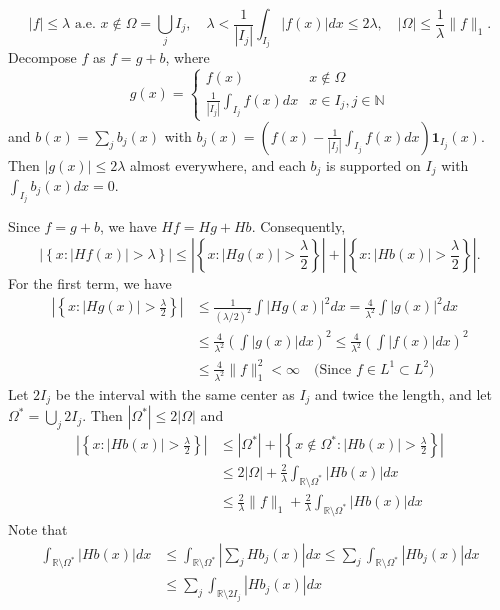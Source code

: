\documentclass[12pt,openany]{book}
\theoremstyle{definition}
\begin{document}
$$
|f| \leq \lambda \text{ a.e. } x \notin \Omega = \bigcup_j I_j, \quad \lambda < \frac{1}{\left|I_j\right|} \int_{I_j} |f(x)| dx \leq 2\lambda, \quad |\Omega| \leq \frac{1}{\lambda} \|f\|_1.
$$
Decompose $f$ as $f = g + b$, where
$$
g(x) = \begin{cases} 
f(x) & x \notin \Omega \\
\frac{1}{\left|I_j\right|} \int_{I_j} f(x) dx & x \in I_j, j \in \mathbb{N}
\end{cases}
$$
and $b(x) = \sum_j b_j(x)$ with $b_j(x) = \left(f(x) - \frac{1}{\left|I_j\right|} \int_{I_j} f(x) dx\right) \textbf{1}_{I_j}(x)$. Then $|g(x)| \leq 2\lambda$ almost everywhere, and each $b_j$ is supported on $I_j$ with $\int_{I_j} b_j (x) dx = 0$.

Since $f = g + b$, we have $H f = H g + H b$. Consequently,
$$
\left|\left\{x: |H f(x)| > \lambda\right\}\right| \leq \left|\left\{x: |H g(x)| > \frac{\lambda}{2}\right\}\right| + \left|\left\{x: |H b(x)| > \frac{\lambda}{2}\right\}\right|.
$$
For the first term, we have
$$
\begin{aligned}
\left|\left\{x: |Hg(x)| > \frac{\lambda}{2}\right\}\right| &\leqslant \frac{1}{(\lambda/2)^2} \int |Hg(x)|^2 dx = \frac{4}{\lambda^2} \int |g(x)|^2 dx \\
&\leqslant \frac{4}{\lambda^2} \left( \int |g(x)| dx \right)^2 \leqslant \frac{4}{\lambda^2} \left( \int |f(x)| dx \right)^2 \\
&\leqslant \frac{4}{\lambda^2} \|f\|_1^2 < \infty \quad \text{(Since } f \in L^1 \subset L^2\text{)}
\end{aligned}
$$
Let $2I_j$ be the interval with the same center as $I_j$ and twice the length, and let $\Omega^* = \bigcup_j 2I_j$. Then $|\Omega^*| \leq 2|\Omega|$ and
$$
\begin{aligned}
\left|\left\{x: |Hb(x)| > \frac{\lambda}{2}\right\}\right| &\leq |\Omega^*| + \left|\left\{x \notin \Omega^*: |Hb(x)| > \frac{\lambda}{2}\right\}\right| \\
&\leq 2|\Omega| + \frac{2}{\lambda} \int_{\mathbb{R} \setminus \Omega^*}|Hb(x)| dx \\
&\leq \frac{2}{\lambda}\|f\|_1 + \frac{2}{\lambda} \int_{\mathbb{R} \setminus \Omega^*}|Hb(x)| dx
\end{aligned}
$$
Note that
$$
\begin{aligned}
\int_{\mathbb{R} \setminus \Omega^*}|Hb(x)| dx &\leq \int_{\mathbb{R} \setminus \Omega^*}\left|\sum_j Hb_j(x)\right| dx \leq \sum_j \int_{\mathbb{R} \setminus \Omega^*}|Hb_j(x)| dx \\
&\leq \sum_j \int_{\mathbb{R} \setminus 2I_j}|Hb_j(x)| dx
\end{aligned}
$$
\end{document}
